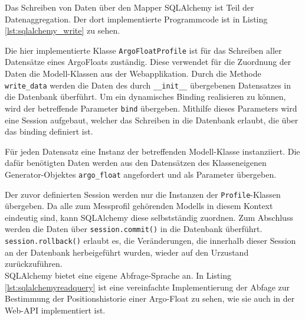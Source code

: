 

Das Schreiben von Daten über den Mapper SQLAlchemy ist Teil der Datenaggregation. Der dort implementierte Programmcode ist in Listing \ref{lst:sqlalchemy_write} zu sehen.




Die hier implementierte Klasse \texttt{ArgoFloatProfile} ist für das Schreiben aller Datensätze eines ArgoFloats zuständig. Diese verwendet für die Zuordnung der Daten die Modell-Klassen aus der Webapplikation. Durch die Methode \texttt{write\_data} werden die Daten des durch \texttt{\_\_init\_\_} übergebenen Datensatzes in die Datenbank überführt.
Um ein dynamisches Binding realisieren zu können, wird der betreffende Parameter \texttt{bind} übergeben. Mithilfe dieses Parameters wird eine Session aufgebaut, welcher das Schreiben in die Datenbank erlaubt, die über das binding definiert ist.

Für jeden Datensatz eine Instanz der betreffenden Modell-Klasse instanziiert. Die dafür benötigten Daten werden aus den Datensätzen des Klasseneigenen Generator-Objektes \texttt{argo\_float} angefordert und als Parameter übergeben.

Der zuvor definierten Session werden nur die Instanzen der \texttt{Profile}-Klassen übergeben. Da alle zum Messprofil gehörenden Modells in diesem Kontext eindeutig sind, kann SQLAlchemy diese selbstständig zuordnen.
Zum Abschluss werden die Daten über \texttt{session.commit()} in die Datenbank überführt.
\texttt{session.rollback()} erlaubt es, die Veränderungen, die innerhalb dieser Session an der Datenbank herbeigeführt wurden, wieder auf den Urzustand zurückzuführen.  \\

SQLAlchemy bietet eine eigene Abfrage-Sprache an. In Listing \ref{lst:sqlalchemyreadquery} ist eine vereinfachte Implementierung der Abfage zur Bestimmung der Positionshistorie einer Argo-Float zu sehen, wie sie auch in der Web-API implementiert ist. 


